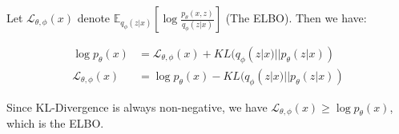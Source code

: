 \documentclass{article}
\begin{document}
\color{blue}

Let $\mathcal{L}_{\theta, \phi}(x)$ denote $\mathbb{E}_{q_\phi(z|x)}\left[\log\frac{p_\theta(x,z)}{q_\phi(z|x)}\right]$ (The ELBO). Then we have:

\begin{align}
    \log p_\theta(x) &= \mathcal{L}_{\theta, \phi}(x) + KL(q_\phi(z|x)||p_\theta(z|x))\\
    \mathcal{L}_{\theta, \phi}(x) &= \log p_\theta(x) - KL(q_\phi(z|x)||p_\theta(z|x))
\end{align}

Since KL-Divergence is always non-negative, we have $\mathcal{L}_{\theta, \phi}(x) \geq \log p_\theta(x)$, which is the ELBO.

\color{black}
\end{document}
